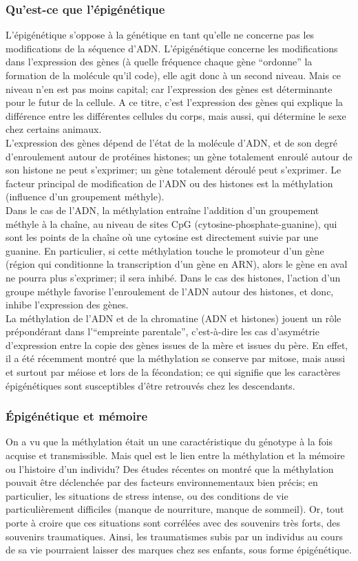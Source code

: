 \documentclass[french]{article}
\begin{document}
			\subsubsection{Qu'est-ce que l'épigénétique}
				L'épigénétique s'oppose à la génétique en tant qu'elle ne concerne pas les modifications de la séquence d'ADN. L'épigénétique concerne les modifications dans l'expression des gènes (à quelle fréquence chaque gène ``ordonne'' la formation de la molécule qu'il code), elle agit donc à un second niveau. Mais ce niveau n'en est pas moins capital; car l'expression des gènes est déterminante pour le futur de la cellule. A ce titre, c'est l'expression des gènes qui explique la différence entre les différentes cellules du corps, mais aussi, qui détermine le sexe chez certains animaux.\\
				L'expression des gènes dépend de l'état de la molécule d'ADN, et de son degré d'enroulement autour de protéines histones; un gène totalement enroulé autour de son histone ne peut s'exprimer; un gène totalement déroulé peut s'exprimer. Le facteur principal de modification de l'ADN ou des histones est la méthylation (influence d'un groupement méthyle).\\
				Dans le cas de l'ADN, la méthylation entraîne l'addition d'un groupement méthyle à la chaîne, au niveau de sites CpG (cytosine-phosphate-guanine), qui sont les points de la chaîne où une cytosine est directement suivie par une guanine. En particulier, si cette méthylation touche le promoteur d'un gène (région qui conditionne la transcription d'un gène en ARN), alors le gène en aval ne pourra plus s'exprimer; il sera inhibé. Dans le cas des histones, l'action d'un groupe méthyle favorise l'enroulement de l'ADN autour des histones, et donc, inhibe l'expression des gènes.\\
				La méthylation de l'ADN et de la chromatine (ADN et histones) jouent un rôle prépondérant dans l'``empreinte parentale'', c'est-à-dire les cas d'asymétrie d'expression entre la copie des gènes issues de la mère et issues du père. En effet, il a été récemment montré que la méthylation se conserve par mitose, mais aussi et surtout par méiose et lors de la fécondation; ce qui signifie que les caractères épigénétiques sont susceptibles d'être retrouvés chez les descendants.
			\subsubsection{Épigénétique et mémoire}
				On a vu que la méthylation était un une caractéristique du génotype à la fois acquise et transmissible. Mais quel est le lien entre la méthylation et la mémoire ou l'histoire d'un individu? Des études récentes on montré que la méthylation pouvait être déclenchée par des facteurs environnementaux bien précis; en particulier, les situations de stress intense, ou des conditions de vie particulièrement difficiles (manque de nourriture, manque de sommeil). Or, tout porte à croire que ces situations sont corrélées avec des souvenirs très forts, des souvenirs traumatiques. Ainsi, les traumatismes subis par un individus au cours de sa vie pourraient laisser des marques chez ses enfants, sous forme épigénétique.
				
\end{document}
